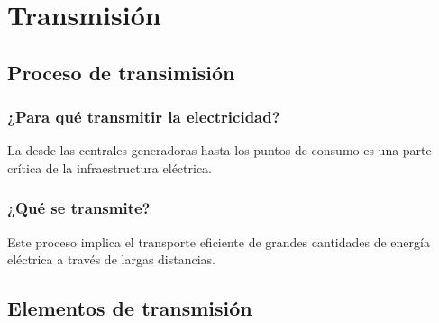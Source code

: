 \documentclass[14pt]{beamer}
\begin{document}
\section{Transmisión}
\subsection{Proceso de transimisión}

\begin{frame}
\frametitle{¿Para qué transmitir la electricidad?}
La  desde las centrales generadoras hasta los puntos de consumo es una parte crítica de la infraestructura eléctrica.
\end{frame}
\begin{frame}
\frametitle{¿Qué se transmite?}
Este proceso implica el transporte eficiente de grandes cantidades de energía eléctrica a través de largas distancias.
\end{frame}

\subsection{Elementos de transmisión}
\end{document}
